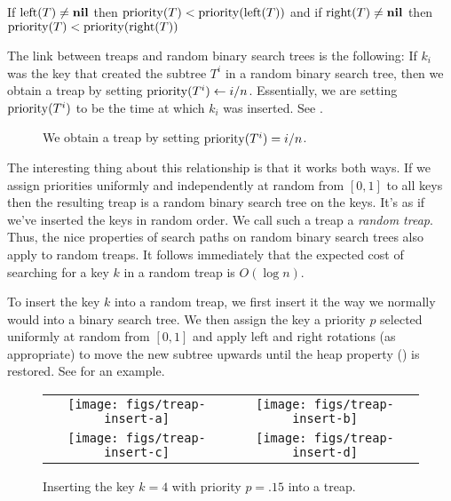 \begin{prop}
If $\mathrm{left}(T)\neq\mathbf{nil}$ then $\mathrm{priority}(T) < \mathrm{priority}(\mathrm{left}(T))$ and if
$\mathrm{right}(T)\neq\mathbf{nil}$ then $\mathrm{priority}(T) <\mathrm{priority}(\mathrm{right}(T))$
\end{prop}

The link between treaps and random binary search trees is the following:
If $k_i$ was the key that created the subtree $T^i$ in a random binary
search tree, then we obtain a treap by setting $\mathrm{priority}(T^i)\gets i/n$.
Essentially, we are setting $\mathrm{priority}(T^i)$ to be the time at which $k_i$
was inserted.  See .

\begin{figure}
\caption{We obtain a treap by setting $\mathrm{priority}(T^i)=i/n$.}
\end{figure}

The interesting thing about this relationship is that it works both
ways. If we assign priorities uniformly and independently at random from
$[0,1]$ to all keys then the resulting treap is a random binary search
tree on the keys. It's as if we've inserted the keys in random order.
We call such a treap a \emph{random treap}.  Thus, the nice properties of
search paths on random binary search trees also apply to random treaps.
It follows immediately that the expected cost of searching for a key $k$
in a random treap is $O(\log n)$.

To insert the key $k$ into a random treap, we first insert it the way
we normally would into a binary search tree.  We then assign the key a
priority $p$ selected uniformly at random from $[0,1]$ and apply left and
right rotations (as appropriate) to move the new subtree upwards until
the heap property () is restored.  See 
for an example.

\begin{figure}
\begin{center}\begin{tabular}{cc}
\texttt{[image: figs/treap-insert-a]} & \texttt{[image: figs/treap-insert-b]} \\[1cm]
\texttt{[image: figs/treap-insert-c]} & \texttt{[image: figs/treap-insert-d]} \\
\end{tabular}\end{center}
\caption{Inserting the key $k=4$ with priority $p=.15$ into a treap.}
\end{figure}

